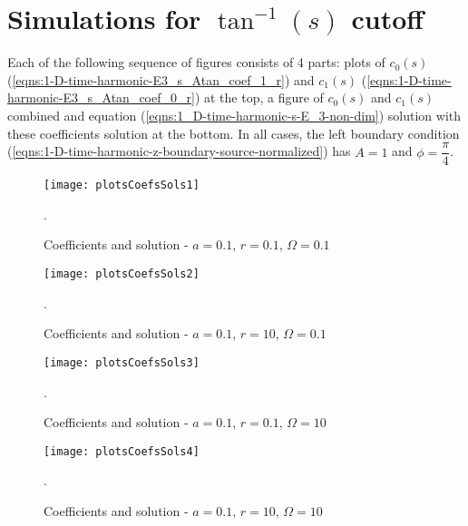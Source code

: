 \documentclass[12pt,twoside]{report}
\begin{document}
\newpage

\section{Simulations for $\tan^{-1}(s)$ cutoff}

Each of the following sequence of figures consists of 4 parts: plots of $c_0(s)$ (\ref{eqns:1-D-time-harmonic-E3_s_Atan_coef_1_r}) and $c_1(s)$ (\ref{eqns:1-D-time-harmonic-E3_s_Atan_coef_0_r}) at the top, a figure of $c_0(s)$ and $c_1(s)$ combined and equation (\ref{eqns:1_D-time-harmonic-s-E_3-non-dim}) solution with these coefficients solution at the bottom. In all cases, the left boundary condition (\ref{eqns:1-D-time-harmonic-z-boundary-source-normalized}) has $A=1$ and $\phi=\dfrac{\pi}{4}$.  

\begin{figure}[!htb] 
\begin{center}
\texttt{[image: plotsCoefsSols1]}
\end{center}
\caption {Coefficients and solution - $a = 0.1$, $r = 0.1$, $\Omega = 0.1$}.

\label{fig:atanCoefsPlots1}
\end{figure}

\begin{figure} 
\begin{center}
\texttt{[image: plotsCoefsSols2]}
\end{center}
\caption {Coefficients and solution - $a = 0.1$, $r = 10$, $\Omega = 0.1$}.

\label{fig:atanCoefsPlots2}
\end{figure}

\begin{figure} 
\begin{center}
\texttt{[image: plotsCoefsSols3]}
\end{center}
\caption {Coefficients and solution - $a = 0.1$, $r = 0.1$, $\Omega = 10$}.

\label{fig:atanCoefsPlots3}
\end{figure}

\begin{figure} 
\begin{center}
\texttt{[image: plotsCoefsSols4]}
\end{center}
\caption {Coefficients and solution - $a = 0.1$, $r = 10$, $\Omega = 10$}.

\label{fig:atanCoefsPlots4}
\end{figure}
\end{document}
